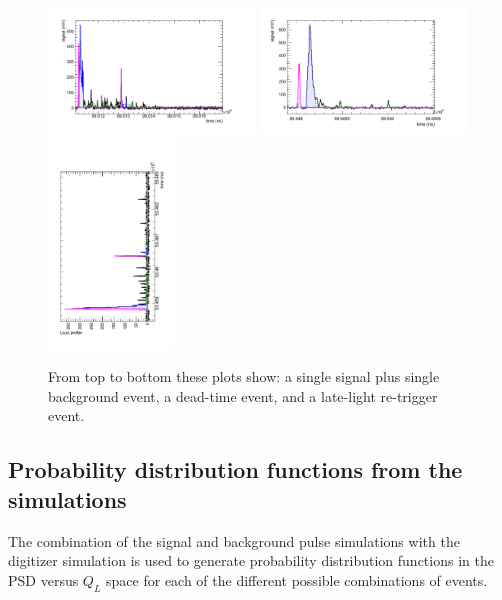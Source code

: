 \documentclass[letter,twocolumn,preprint,3p]{elsarticle}
\begin{document}
\begin{figure}[!htpb]
\centering
\includegraphics[width=0.49\textwidth]{figures/pileup1.pdf}
\includegraphics[width=0.49\textwidth]{figures/retrig1.pdf}
\includegraphics[width=0.3\textwidth,angle=-90]{figures/latelight1.pdf}
\caption{ From top to bottom these plots show: a single signal plus
  single background event, a dead-time event, and a late-light
  re-trigger event. }\label{fig:eventTypes2}
\end{figure}



\subsection{ Probability distribution functions from the simulations }

The combination of the signal and background pulse simulations with
the digitizer simulation is used to generate probability distribution
functions in the PSD versus $Q_L$ space for each of the different
possible combinations of events.
\end{document}
